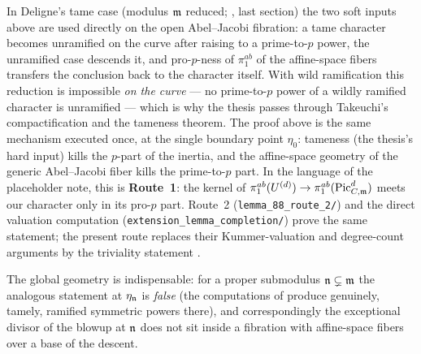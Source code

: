 \begin{rem*}
    In Deligne's tame case (modulus $\mdls$ reduced;
    \cite{tendler2015geometricclassfieldtheory}, last section) the two soft inputs above
    are used directly on the open Abel--Jacobi fibration: a tame character becomes
    unramified on the curve after raising to a prime-to-$p$ power, the unramified case
    descends it, and pro-$p$-ness of $\pi_1^{ab}$ of the affine-space fibers transfers the
    conclusion back to the character itself. With wild ramification this reduction is
    impossible \emph{on the curve} --- no prime-to-$p$ power of a wildly ramified character
    is unramified --- which is why the thesis passes through Takeuchi's compactification
    and the tameness theorem. The proof above is the same mechanism executed once, at the
    single boundary point $\eta_0$: tameness (the thesis's hard input) kills the $p$-part
    of the inertia, and the affine-space geometry of the generic Abel--Jacobi fiber kills
    the prime-to-$p$ part. In the language of the placeholder note, this is
    \textbf{Route~1}: the kernel of
    $\pi_1^{ab}(U^{(d)}) \to \pi_1^{ab}(\PicCm[d])$ meets our character only in its
    pro-$p$ part. Route~2 (\texttt{lemma\_88\_route\_2/}) and the direct valuation
    computation (\texttt{extension\_lemma\_completion/}) prove the same statement; the
    present route replaces their Kummer-valuation and degree-count arguments by the
    triviality statement .

    The global geometry is indispensable: for a proper submodulus
    $\ndls \subsetneq \mdls$ the analogous statement at $\eta_\ndls$ is \emph{false} (the
    computations of  produce genuinely,
    tamely, ramified symmetric powers there), and correspondingly the exceptional divisor
    of the blowup at $\ndls$ does not sit inside a fibration with affine-space fibers over
    a base of the descent.
\end{rem*}
